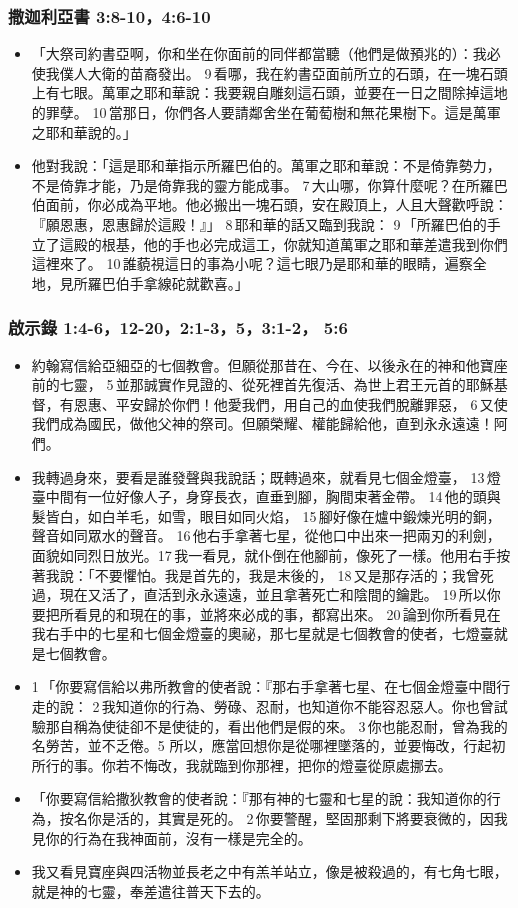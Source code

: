 \subsubsection{撒迦利亞書 3:8-10，4:6-10}
\begin{itemize} 
\itemsep-.25em
\item 「大祭司約書亞啊，你和坐在你面前的同伴都當聽（他們是做預兆的）：我必使我僕人大衛的苗裔發出。 9 看哪，我在約書亞面前所立的石頭，在一塊石頭上有七眼。萬軍之耶和華說：我要親自雕刻這石頭，並要在一日之間除掉這地的罪孽。 10 當那日，你們各人要請鄰舍坐在葡萄樹和無花果樹下。這是萬軍之耶和華說的。」
\item 他對我說：「這是耶和華指示所羅巴伯的。萬軍之耶和華說：不是倚靠勢力，不是倚靠才能，乃是倚靠我的靈方能成事。 7 大山哪，你算什麼呢？在所羅巴伯面前，你必成為平地。他必搬出一塊石頭，安在殿頂上，人且大聲歡呼說：『願恩惠，恩惠歸於這殿！』」 8 耶和華的話又臨到我說： 9 「所羅巴伯的手立了這殿的根基，他的手也必完成這工，你就知道萬軍之耶和華差遣我到你們這裡來了。 10 誰藐視這日的事為小呢？這七眼乃是耶和華的眼睛，遍察全地，見所羅巴伯手拿線砣就歡喜。」
\end{itemize} 

\subsubsection{啟示錄 1:4-6，12-20，2:1-3，5，3:1-2， 5:6}
\begin{itemize} 
\itemsep-.25em
\item 約翰寫信給亞細亞的七個教會。但願從那昔在、今在、以後永在的神和他寶座前的七靈， 5 並那誠實作見證的、從死裡首先復活、為世上君王元首的耶穌基督，有恩惠、平安歸於你們！他愛我們，用自己的血使我們脫離罪惡， 6 又使我們成為國民，做他父神的祭司。但願榮耀、權能歸給他，直到永永遠遠！阿們。
\item 我轉過身來，要看是誰發聲與我說話；既轉過來，就看見七個金燈臺， 13 燈臺中間有一位好像人子，身穿長衣，直垂到腳，胸間束著金帶。 14 他的頭與髮皆白，如白羊毛，如雪，眼目如同火焰， 15 腳好像在爐中鍛煉光明的銅，聲音如同眾水的聲音。 16 他右手拿著七星，從他口中出來一把兩刃的利劍，面貌如同烈日放光。17 我一看見，就仆倒在他腳前，像死了一樣。他用右手按著我說：「不要懼怕。我是首先的，我是末後的， 18 又是那存活的；我曾死過，現在又活了，直活到永永遠遠，並且拿著死亡和陰間的鑰匙。 19 所以你要把所看見的和現在的事，並將來必成的事，都寫出來。 20 論到你所看見在我右手中的七星和七個金燈臺的奧祕，那七星就是七個教會的使者，七燈臺就是七個教會。
\item 1 「你要寫信給以弗所教會的使者說：『那右手拿著七星、在七個金燈臺中間行走的說： 2 我知道你的行為、勞碌、忍耐，也知道你不能容忍惡人。你也曾試驗那自稱為使徒卻不是使徒的，看出他們是假的來。 3 你也能忍耐，曾為我的名勞苦，並不乏倦。5 所以，應當回想你是從哪裡墜落的，並要悔改，行起初所行的事。你若不悔改，我就臨到你那裡，把你的燈臺從原處挪去。
\item 「你要寫信給撒狄教會的使者說：『那有神的七靈和七星的說：我知道你的行為，按名你是活的，其實是死的。 2 你要警醒，堅固那剩下將要衰微的，因我見你的行為在我神面前，沒有一樣是完全的。
\item 我又看見寶座與四活物並長老之中有羔羊站立，像是被殺過的，有七角七眼，就是神的七靈，奉差遣往普天下去的。
\end{itemize} 

